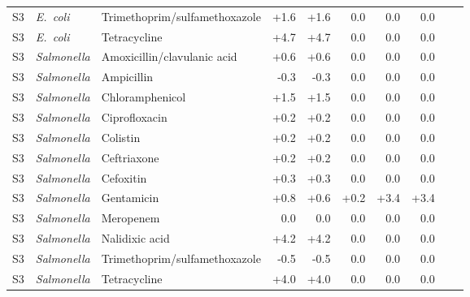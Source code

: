 {\begin{longtable}{lllrrrrrrr}
S3 & \textit{E.~coli} & Trimethoprim/sulfamethoxazole & +1.6 & +1.6 & 0.0 & 0.0 & 0.0 &  &  \\
S3 & \textit{E.~coli} & Tetracycline & +4.7 & +4.7 & 0.0 & 0.0 & 0.0 &  &  \\
S3 & \textit{Salmonella} & Amoxicillin/clavulanic acid & +0.6 & +0.6 & 0.0 & 0.0 & 0.0 &  &  \\
S3 & \textit{Salmonella} & Ampicillin & -0.3 & -0.3 & 0.0 & 0.0 & 0.0 &  &  \\
S3 & \textit{Salmonella} & Chloramphenicol & +1.5 & +1.5 & 0.0 & 0.0 & 0.0 &  &  \\
S3 & \textit{Salmonella} & Ciprofloxacin & +0.2 & +0.2 & 0.0 & 0.0 & 0.0 &  &  \\
S3 & \textit{Salmonella} & Colistin & +0.2 & +0.2 & 0.0 & 0.0 & 0.0 &  &  \\
S3 & \textit{Salmonella} & Ceftriaxone & +0.2 & +0.2 & 0.0 & 0.0 & 0.0 &  &  \\
S3 & \textit{Salmonella} & Cefoxitin & +0.3 & +0.3 & 0.0 & 0.0 & 0.0 &  &  \\
S3 & \textit{Salmonella} & Gentamicin & +0.8 & +0.6 & +0.2 & +3.4 & +3.4 &  &  \\
S3 & \textit{Salmonella} & Meropenem & 0.0 & 0.0 & 0.0 & 0.0 & 0.0 &  &  \\
S3 & \textit{Salmonella} & Nalidixic acid & +4.2 & +4.2 & 0.0 & 0.0 & 0.0 &  &  \\
S3 & \textit{Salmonella} & Trimethoprim/sulfamethoxazole & -0.5 & -0.5 & 0.0 & 0.0 & 0.0 &  &  \\
S3 & \textit{Salmonella} & Tetracycline & +4.0 & +4.0 & 0.0 & 0.0 & 0.0 &  &  \\
\bottomrule
\end{longtable}}

